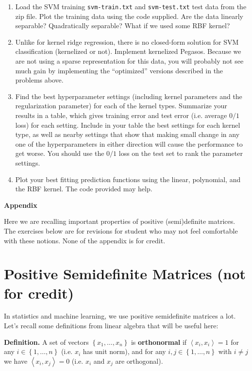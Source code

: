 \documentclass{article}
\theoremstyle{plain}
\theoremstyle{definition}
\begin{document}
\begin{enumerate}
  \setcounter{enumi}{\value{saveenum}}
\item Load the SVM training \texttt{svm-train.txt} and \texttt{svm-test.txt} test data from the zip file.
Plot the training data using the code supplied. Are the data linearly
separable? Quadratically separable? What if we used some RBF kernel?
\item Unlike for kernel ridge regression, there is no closed-form
solution for SVM classification (kernelized or not). Implement kernelized
Pegasos. Because we are not using a sparse representation for this
data, you will probably not see much gain by implementing the ``optimized''
versions described in the problems above.
\item Find the best hyperparameter settings (including kernel
parameters and the regularization parameter) for each of the kernel
types. Summarize your results in a table, which gives training error
and test error (i.e. average $0/1$ loss) for each setting. Include
in your table the best settings for each kernel type, as well as nearby
settings that show that making small change in any one of the hyperparameters
in either direction will cause the performance to get worse. You should
use the $0/1$ loss on the test set to rank the parameter settings. 
\item Plot your best fitting prediction functions using the
linear, polynomial, and the RBF kernel. The code provided may help.
\setcounter{saveenum}{\value{enumi}}
\end{enumerate}

\appendix
{ \huge \bf Appendix}


Here we are recalling important properties of positive (semi)definite matrices. 
The exercises below are for revisions for student who may not feel comfortable with these notions.  None of the appendix is for credit. 

\section{Positive Semidefinite Matrices (not for credit)}

In statistics and machine learning, we use positive semidefinite matrices
a lot. Let's recall some definitions from linear algebra that will
be useful here:

{\bf Definition. }
A set of vectors $\left\{ x_{1},\ldots,x_{n}\right\} $ is \textbf{orthonormal}
if $\left\langle x_{i},x_{i}\right\rangle =1$ for any $i\in\left\{ 1,\ldots,n\right\} $
(i.e. $x_{i}$ has unit norm), and for any $i,j\in\left\{ 1,\ldots,n\right\} $
with $i\neq j$ we have $\left\langle x_{i},x_{j}\right\rangle =0$
(i.e. $x_{i}$ and $x_{j}$ are orthogonal).
\end{document}
